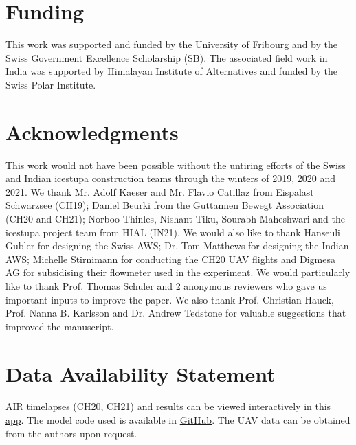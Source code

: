 \documentclass[utf8]{frontiersSCNS} %
\begin{document}
\section*{Funding} This work was supported and funded by the University of Fribourg and by the Swiss Government
Excellence Scholarship (SB). The associated field work in India was supported by Himalayan Institute of
Alternatives and funded by the Swiss Polar Institute.

\section*{Acknowledgments} This work would not have been possible without the untiring efforts of the Swiss and
Indian icestupa construction teams through the winters of 2019, 2020 and 2021. We thank Mr. Adolf Kaeser and Mr.
Flavio Catillaz from Eispalast Schwarzsee (CH19); Daniel Beurki from the Guttannen Bewegt Association (CH20 and
CH21); Norboo Thinles, Nishant Tiku, Sourabh Maheshwari and the icestupa project team from HIAL (IN21).  We
would also like to thank Hanseuli Gubler for designing the Swiss AWS; Dr. Tom Matthews for designing the Indian
AWS; Michelle Stirnimann for conducting the CH20 UAV flights and Digmesa AG for subsidising their flowmeter
used in the experiment.  We would particularly like to thank Prof. Thomas Schuler and 2 anonymous reviewers who
gave us important inputs to improve the paper. We also thank Prof. Christian Hauck, Prof.  Nanna B. Karlsson and
Dr.  Andrew Tedstone for valuable suggestions that improved the manuscript.

\section*{Data Availability Statement} AIR timelapses (CH20, CH21) and results can be viewed interactively in
this \href{https://share.streamlit.io/gayashiva/air_model/src/visualization/webApp.py}{app}.  The model code
used is available in \href{https://github.com/Gayashiva/air_model}{GitHub}. The UAV data can be obtained from
the authors upon request.

 
\end{document}
